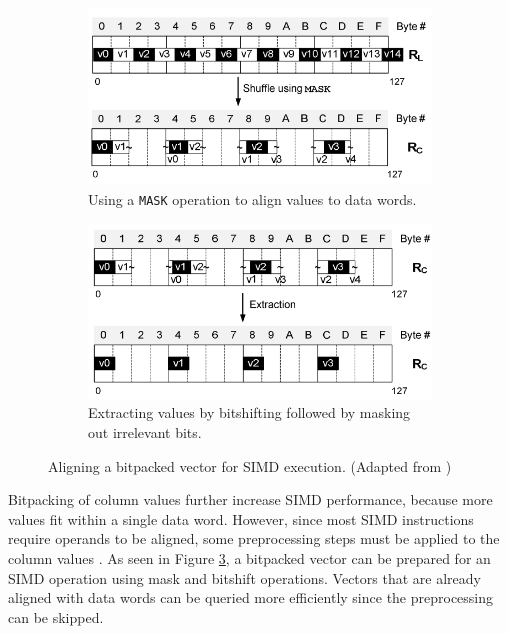 \begin{figure}
  \centering
  \begin{subfigure}{0.45\textwidth}
    \includegraphics[width=\textwidth]{img/simd-align-1.png}
    \caption{Using a \texttt{MASK} operation to align values to data words.}
    \label{fig:simd-align-1} 
  \end{subfigure}
  \begin{subfigure}{0.45\textwidth}
    \includegraphics[width=\textwidth]{img/simd-align-2.png}
    \caption{Extracting values by bitshifting followed by masking out irrelevant bits.}
    \label{fig:simd-align-2} 
  \end{subfigure}
  \caption{Aligning a bitpacked vector for SIMD execution. (Adapted from \cite{Willhalm2009-hu})}
  \label{fig:simd-align} 
\end{figure}

Bitpacking of column values further increase SIMD performance, because more values fit within a single data word. However, since most SIMD instructions require operands to be aligned, some preprocessing steps must be applied to the column values \cite{Willhalm2009-hu}. As seen in Figure \ref{fig:simd-align}, a bitpacked vector can be prepared for an SIMD operation using mask and bitshift operations. Vectors that are already aligned with data words can be queried more efficiently since the preprocessing can be skipped.

